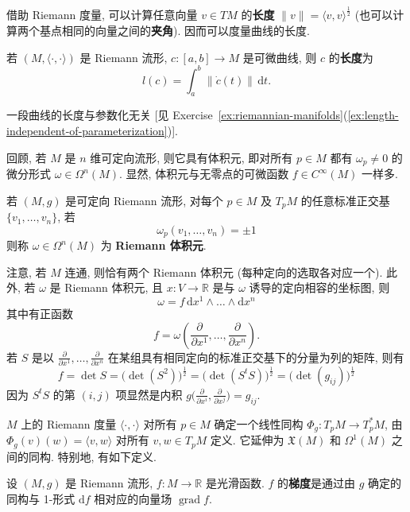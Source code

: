借助 Riemann 度量, 可以计算任意向量 $v\in TM$ 的\textbf{长度} $\lVert v\rVert=\langle v,v\rangle^{\frac12}$ (也可以计算两个基点相同的向量之间的\label{idx:angle-between-tangent-vectors}\textbf{夹角}). 因而可以度量曲线的长度.

\begin{RiemannDefinition}\label{def:length-of-curve}
若 $(M,\langle\cdot,\cdot\rangle)$ 是 Riemann 流形, $c:[a,b]\to M$ 是可微曲线, 则 $c$ 的\textbf{长度}为
\[
  l(c)=\int_a^b\lVert\dot c(t)\rVert\,\mathrm{d}t.
\]
\end{RiemannDefinition}

一段曲线的长度与参数化无关 [见 Exercise~\ref{ex:riemannian-manifolds}(\ref{ex:length-independent-of-parameterization})].

回顾, 若 $M$ 是 $n$ 维可定向流形, 则它具有体积元, 即对所有 $p\in M$ 都有 $\omega_p\ne0$ 的微分形式 $\omega\in\Omega^n(M)$. 显然, 体积元与无零点的可微函数 $f\in C^\infty(M)$ 一样多.

\begin{RiemannDefinition}\label{def:riemannian-volume-element}
若 $(M,g)$ 是可定向 Riemann 流形, 对每个 $p\in M$ 及 $T_pM$ 的任意标准正交基 $\{v_1,\ldots,v_n\}$, 若
\[
  \omega_p(v_1,\ldots,v_n)=\pm1
\]
则称 $\omega\in\Omega^n(M)$ 为 \textbf{Riemann 体积元}.
\end{RiemannDefinition}

注意, 若 $M$ 连通, 则恰有两个 Riemann 体积元 (每种定向的选取各对应一个). 此外, 若 $\omega$ 是 Riemann 体积元, 且 $x:V\to\mathbb{R}$ 是与 $\omega$ 诱导的定向相容的坐标图, 则
\[
  \omega=f\,\mathrm{d}x^1\wedge\ldots\wedge\mathrm{d}x^n
\]
其中有正函数
\[
  f=\omega\left(\frac{\partial}{\partial x^1},\ldots,\frac{\partial}{\partial x^n}\right).
\]
若 $S$ 是以 $\frac{\partial}{\partial x^1},\ldots,\frac{\partial}{\partial x^n}$ 在某组具有相同定向的标准正交基下的分量为列的矩阵, 则有
\[
  f=\det S=\bigl(\det(S^2)\bigr)^{\frac12}
  =\bigl(\det(S^tS)\bigr)^{\frac12}=\bigl(\det(g_{ij})\bigr)^{\frac12}
\]
因为 $S^tS$ 的第 $(i,j)$ 项显然是内积 $g\bigl(\frac{\partial}{\partial x^i},\frac{\partial}{\partial x^j}\bigr)=g_{ij}$.

$M$ 上的 Riemann 度量 $\langle\cdot,\cdot\rangle$ 对所有 $p\in M$ 确定一个线性同构 $\Phi_g:T_pM\to T_p^*M$, 由 $\Phi_g(v)(w)=\langle v,w\rangle$ 对所有 $v,w\in T_pM$ 定义. 它延伸为 $\mathfrak{X}(M)$ 和 $\Omega^1(M)$ 之间的同构. 特别地, 有如下定义.

\begin{RiemannDefinition}\label{def:gradient-of-function}
设 $(M,g)$ 是 Riemann 流形, $f:M\to\mathbb{R}$ 是光滑函数. $f$ 的\textbf{梯度}是通过由 $g$ 确定的同构与 1-形式 $\mathrm{d}f$ 相对应的向量场 $\operatorname{grad}f$.
\end{RiemannDefinition}

